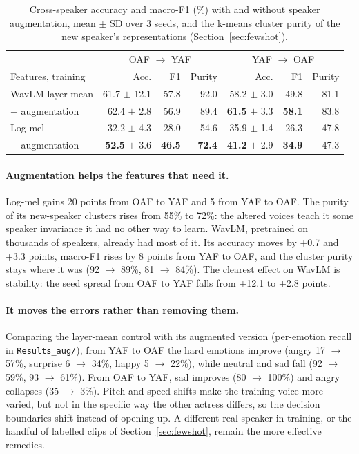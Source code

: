 \documentclass[11pt,a4paper]{article}
\newcommand{\code}[1]{\texttt{#1}}
\begin{document}
\begin{table}[H]\centering\small
\caption{Cross-speaker accuracy and macro-F1 (\%) with and without speaker augmentation, mean $\pm$ SD over 3
seeds, and the k-means cluster purity of the new speaker's representations (Section~\ref{sec:fewshot}).}
\label{tab:aug}
\begin{tabular}{@{}lrrrrrr@{}}
\toprule
 & \multicolumn{3}{c}{OAF $\to$ YAF} & \multicolumn{3}{c}{YAF $\to$ OAF} \\
Features, training & Acc. & F1 & Purity & Acc. & F1 & Purity \\
\midrule
WavLM layer mean & 61.7 $\pm$ 12.1 & 57.8 & 92.0 & 58.2 $\pm$ 3.0 & 49.8 & 81.1 \\
\quad + augmentation & 62.4 $\pm$ 2.8 & 56.9 & 89.4 & \textbf{61.5} $\pm$ 3.3 & \textbf{58.1} & 83.8 \\
Log-mel & 32.2 $\pm$ 4.3 & 28.0 & 54.6 & 35.9 $\pm$ 1.4 & 26.3 & 47.8 \\
\quad + augmentation & \textbf{52.5} $\pm$ 3.6 & \textbf{46.5} & \textbf{72.4} & \textbf{41.2} $\pm$ 2.9 &
\textbf{34.9} & 47.3 \\
\bottomrule
\end{tabular}
\end{table}

\paragraph{Augmentation helps the features that need it.} Log-mel gains 20 points from OAF to YAF and 5 from YAF to
OAF. The purity of its new-speaker clusters rises from 55\% to 72\%: the altered voices teach it some speaker
invariance it had no other way to learn. WavLM, pretrained on thousands of speakers, already had most of it. Its
accuracy moves by +0.7 and +3.3 points, macro-F1 rises by 8 points from YAF to OAF, and the cluster purity stays
where it was (92 $\to$ 89\%, 81 $\to$ 84\%). The clearest effect on WavLM is stability: the seed spread from OAF to
YAF falls from $\pm$12.1 to $\pm$2.8 points.

\paragraph{It moves the errors rather than removing them.} Comparing the layer-mean control with its augmented version
(per-emotion recall in \code{Results\_aug/}), from YAF to OAF the hard emotions improve (angry 17
$\to$ 57\%, surprise 6 $\to$ 34\%, happy 5 $\to$ 22\%), while neutral and sad fall (92 $\to$ 59\%, 93 $\to$ 61\%).
From OAF to YAF, sad improves (80 $\to$ 100\%) and angry collapses (35 $\to$ 3\%). Pitch and speed shifts make the
training voice more varied, but not in the specific way the other actress differs, so the decision boundaries
shift instead of opening up. A different real speaker in training, or the handful of labelled clips of
Section~\ref{sec:fewshot}, remain the more effective remedies.
\end{document}
